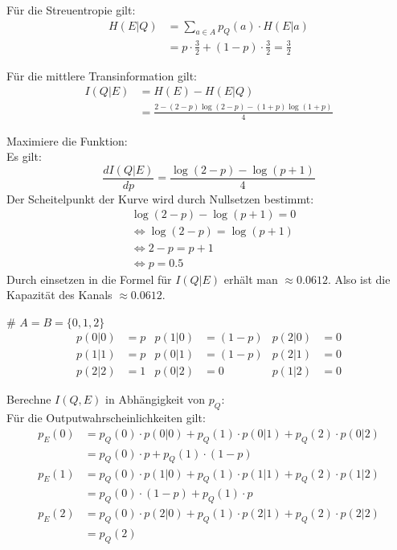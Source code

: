 \begin{myList}
Für die Streuentropie gilt:
\begin{align*}
	H(E|Q) &= \sum\limits_{a \in A} p_Q(a) \cdot H(E|a) \\
	&= p \cdot \frac{3}{2} + (1-p) \cdot \frac{3}{2} = \frac{3}{2}
\end{align*}

Für die mittlere Transinformation gilt:
\begin{align*}
	I(Q|E) &= H(E) - H(E|Q)\\
	&= \frac{2 -(2-p)\log(2-p) - (1+p)\log(1+p)}{4}
\end{align*}

Maximiere die Funktion:\\
Es gilt:
\begin{equation*}
	\frac{dI(Q|E)}{dp} = \frac{\log(2-p)- \log(p+1)}{4}
\end{equation*}
Der Scheitelpunkt der Kurve wird durch Nullsetzen bestimmt:
\begin{align*}
	&\log(2-p) - \log(p+1) = 0 \\
	&\Leftrightarrow \log(2-p) = \log(p+1) \\
	&\Leftrightarrow 2-p = p+1 \\
	&\Leftrightarrow p = 0.5
\end{align*}
Durch einsetzen in die Formel für $I(Q|E)$ erhält man $\approx 0.0612$.
Also ist die Kapazität des Kanals $\approx 0.0612$.

#
$A = B = \lbrace 0,1,2 \rbrace$
\begin{align*}
	p(0|0) &= p & p(1|0) &= (1-p) & p(2|0) &= 0 \\
	p(1|1) &= p & p(0|1) &= (1-p) & p(2|1) &= 0 \\
	p(2|2) &= 1 & p(0|2) &= 0 & p(1|2) &= 0
\end{align*}

Berechne $I(Q,E)$ in Abhängigkeit von $p_Q$:\\
Für die Outputwahrscheinlichkeiten gilt:
\begin{align*}
	p_E(0) &= p_Q(0) \cdot p(0|0) + p_Q(1) \cdot p(0|1) + p_Q(2) \cdot p(0|2) \\
	&= p_Q(0) \cdot p + p_Q(1) \cdot (1-p) \\
	p_E(1) &= p_Q(0) \cdot p(1|0) + p_Q(1) \cdot p(1|1) + p_Q(2) \cdot p(1|2)\\
	&= p_Q(0) \cdot (1-p) + p_Q(1) \cdot p \\
	p_E(2) &= p_Q(0) \cdot p(2|0) + p_Q(1) \cdot p(2|1) + p_Q(2) \cdot p(2|2)\\
	&= p_Q(2)
\end{align*}


\end{myList}
